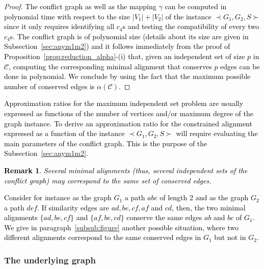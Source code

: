 \documentclass[final]{dmtcs-episciences}
\newtheorem{remark}[theorem]{Remark}
\newcommand\mar[1]{\textcolor{black}{#1}}
\begin{document}
\begin{proof}
\mar{The conflict graph as well as the mapping $\gamma$  can be computed in polynomial time with respect to the size $|V_1|+|V_2|$ of the instance  $\prec G_1,G_2,S \succ$ since it only requires identifying all $c_4$s and testing the compatibility of every two $c_4$s. The conflict graph is of polynomial size (details about its size are given in Subsection~\ref{sec:anym1m2}) and it follows immediately from the proof of Proposition~\ref{prop:reduction_alpha}-(i) that, given an independent set of size $p$ in $\mathcal{C}$, computing the corresponding minimal alignment that conserves $p$ edges can be done in polynomial. We conclude by using the fact that the maximum possible number of conserved edges is $\alpha(\mathcal{C})$.}
\end{proof}

\mar{Approximation ratios for the maximum independent set problem are usually expressed as functions of the number of vertices and/or maximum degree of the graph instance.  To derive an approximation ratio for the constrained alignment expressed as a function of the instance $\prec G_1,G_2,S \succ$ will require evaluating the main parameters of the conflict graph. This is the purpose of the Subsection~\ref{sec:anym1m2}.}

\mar{\begin{remark}\label{rem:noninjective}
Several minimal alignments (thus, several independent sets of the conflict graph) may correspond to the same set of conserved edges.
\end{remark}}

 \mar{Consider for instance as the graph $G_1$ a path $abc$ of length 2 and  as the graph $G_2$ a path $def$. If similarity edges are $ad, be, cf, af$  and $cd$, then, the two minimal alignments $\{ad, be, cf\}$ and $\{af, be, cd\}$ conserve the same edges $ab$ and $bc$ of $G_1$. We give in paragraph~\ref{subsub:figure} another possible situation, where two different alignments correspond to the same conserved edges in $G_1$ but not in $G_2$.}

\subsubsection{The underlying graph}
\end{document}
